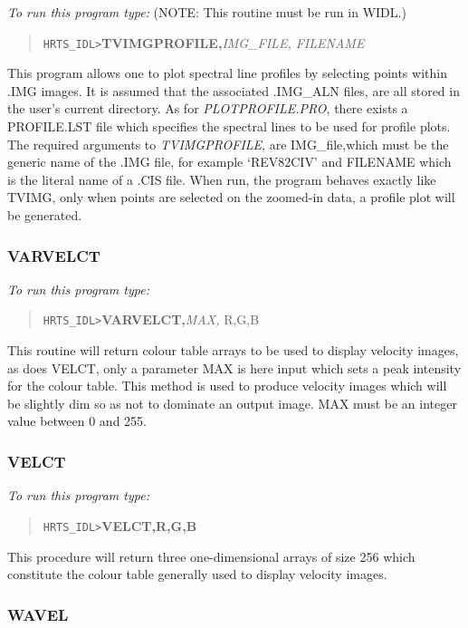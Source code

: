 {\em To run this program type:} (NOTE: This routine must be run in WIDL.)
\begin{quote}
{\tt HRTS\_IDL>}{\bf TVIMGPROFILE,}{\it IMG\_FILE, FILENAME}
\end{quote}
      This program allows one to plot spectral line profiles by selecting
   points within .IMG images.  It is assumed that the  associated .IMG\_ALN
   files, are all stored in the user's current directory.
   As for {\em PLOTPROFILE.PRO}, there exists a PROFILE.LST file which specifies
   the spectral lines to be used for profile plots.  The  required
   arguments to {\em TVIMGPROFILE}, are IMG\_file,which must be the generic name
of the .IMG
   file, for example `REV82CIV' and FILENAME which is the literal name of a
   .CIS file.  When run, the program behaves exactly
   like TVIMG, only when points are selected on the zoomed-in data, a
   profile plot will be generated.

\subsubsection{VARVELCT}

{\em To run this program type:}
\begin{quote}
{\tt HRTS\_IDL>}{\bf VARVELCT,}{\it MAX,} R,G,B
\end{quote}
      This routine will return colour table arrays to be used to display
   velocity images, as does VELCT, only a parameter MAX is here input
   which sets a peak intensity for the colour table.  This method is used
   to produce velocity images which will be slightly dim so as not to
   dominate an output image.  MAX must be an integer value between 0 and
   255.

\subsubsection{VELCT}

{\em To run this program type:}
\begin{quote}
{\tt HRTS\_IDL>}{\bf VELCT,R,G,B}
\end{quote}
      This procedure will return three one-dimensional arrays of size 256
   which constitute the colour table generally used to display velocity
   images.

\subsubsection{WAVEL}

